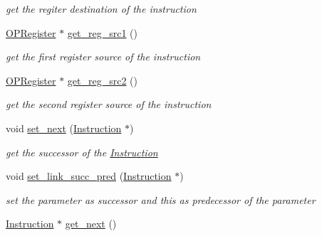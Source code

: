 \begin{DoxyCompactItemize}
\begin{DoxyCompactList}\small\item\em get the regiter destination of the instruction \end{DoxyCompactList}\item 
\hypertarget{classInstruction_ac353a6ad2b3f3b1aee179d5910b5127b}{\hyperlink{classOPRegister}{\-O\-P\-Register} $\ast$ \hyperlink{classInstruction_ac353a6ad2b3f3b1aee179d5910b5127b}{get\-\_\-reg\-\_\-src1} ()}\label{classInstruction_ac353a6ad2b3f3b1aee179d5910b5127b}

\begin{DoxyCompactList}\small\item\em get the first register source of the instruction \end{DoxyCompactList}\item 
\hypertarget{classInstruction_a0eb007b1b0a038610e71a58af3bb6438}{\hyperlink{classOPRegister}{\-O\-P\-Register} $\ast$ \hyperlink{classInstruction_a0eb007b1b0a038610e71a58af3bb6438}{get\-\_\-reg\-\_\-src2} ()}\label{classInstruction_a0eb007b1b0a038610e71a58af3bb6438}

\begin{DoxyCompactList}\small\item\em get the second register source of the instruction \end{DoxyCompactList}\item 
\hypertarget{classInstruction_a2fb436e52a0cc89e7ec08bf0e105bba3}{void \hyperlink{classInstruction_a2fb436e52a0cc89e7ec08bf0e105bba3}{set\-\_\-next} (\hyperlink{classInstruction}{\-Instruction} $\ast$)}\label{classInstruction_a2fb436e52a0cc89e7ec08bf0e105bba3}

\begin{DoxyCompactList}\small\item\em get the successor of the \hyperlink{classInstruction}{\-Instruction} \end{DoxyCompactList}\item 
\hypertarget{classInstruction_ab8f6e21bc94df2198678a3cdbcfaa12e}{void \hyperlink{classInstruction_ab8f6e21bc94df2198678a3cdbcfaa12e}{set\-\_\-link\-\_\-succ\-\_\-pred} (\hyperlink{classInstruction}{\-Instruction} $\ast$)}\label{classInstruction_ab8f6e21bc94df2198678a3cdbcfaa12e}

\begin{DoxyCompactList}\small\item\em set the parameter as successor and this as predecessor of the parameter \end{DoxyCompactList}\item 
\hypertarget{classInstruction_a93d5d6186afcf358c5a21f4c57a0d72e}{\hyperlink{classInstruction}{\-Instruction} $\ast$ \hyperlink{classInstruction_a93d5d6186afcf358c5a21f4c57a0d72e}{get\-\_\-next} ()}\label{classInstruction_a93d5d6186afcf358c5a21f4c57a0d72e}


\end{DoxyCompactItemize}
